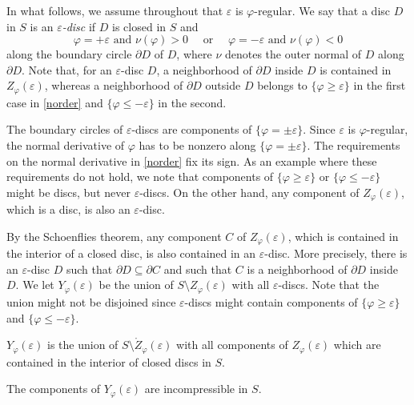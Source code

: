 In what follows, we assume throughout that ${\varepsilon}$ is ${\varphi}$-regular.
We say that a disc $D$ in $S$ is an \emph{${\varepsilon}$-disc} if $D$ is closed in $S$ and
\begin{equation}\label{norder}
  \text{${\varphi}=+{\varepsilon}$ and $\nu({\varphi})>0\quad$ or $\quad{\varphi}=-{\varepsilon}$ and $\nu({\varphi})<0$}
\end{equation}
along the boundary circle $\partial D$ of $D$,
where $\nu$ denotes the outer normal of $D$ along $\partial D$.
Note that, for an ${\varepsilon}$-disc $D$,
a neighborhood of $\partial D$ inside $D$ is contained in $Z_{\varphi}({\varepsilon})$,
whereas a neighborhood of $\partial D$ outside $D$ belongs to $\{{\varphi}\ge{\varepsilon}\}$
in the first case in \eqref{norder} and $\{{\varphi}\le-{\varepsilon}\}$ in the second.

The boundary circles of ${\varepsilon}$-discs are components of $\{{\varphi}=\pm{\varepsilon}\}$.
Since ${\varepsilon}$ is ${\varphi}$-regular,
the normal derivative of ${\varphi}$ has to be nonzero along $\{{\varphi}=\pm{\varepsilon}\}$.
The requirements on the normal derivative in \eqref{norder} fix its sign.
As an example where these requirements do not hold,
we note that components of $\{{\varphi}\ge{\varepsilon}\}$ or $\{{\varphi}\le-{\varepsilon}\}$ might be discs,
but never ${\varepsilon}$-discs.
On the other hand, any component of $Z_{\varphi}({\varepsilon})$, which is a disc, is also an ${\varepsilon}$-disc.

By the Schoenflies theorem, any component $C$ of $Z_{\varphi}({\varepsilon})$,
which is contained in the interior of a closed disc, is also contained in an ${\varepsilon}$-disc.
More precisely, there is an ${\varepsilon}$-disc $D$ such that $\partial D\subseteq\partial C$
and such that $C$ is a neighborhood of $\partial D$ inside $D$.
We let $Y_{\varphi}({\varepsilon})$ be the union of $S\setminus Z_{\varphi}({\varepsilon})$ with all ${\varepsilon}$-discs.
Note that the union might not be disjoined since ${\varepsilon}$-discs might contain components
of $\{{\varphi}\ge{\varepsilon}\}$ and $\{{\varphi}\le-{\varepsilon}\}$.

\begin{lem}\label{yfi}
\begin{inparaenum}[1)]
\item\label{zdisc}
$Y_{\varphi}({\varepsilon})$ is the union of $S\setminus\mathring Z_{\varphi}({\varepsilon})$
with all components of $Z_{\varphi}({\varepsilon})$
which are contained in the interior of closed discs in $S$. \\
\item\label{cinco}
The components of $Y_{\varphi}({\varepsilon})$ are incompressible in $S$.
\end{inparaenum} 
\end{lem}


